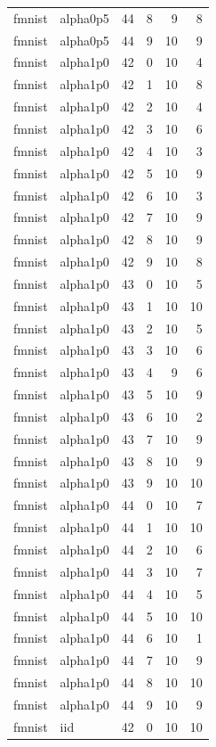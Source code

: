 \begin{tabular}{llrrrr}
fmnist & alpha0p5 & 44 & 8 & 9 & 8 \\
fmnist & alpha0p5 & 44 & 9 & 10 & 9 \\
fmnist & alpha1p0 & 42 & 0 & 10 & 4 \\
fmnist & alpha1p0 & 42 & 1 & 10 & 8 \\
fmnist & alpha1p0 & 42 & 2 & 10 & 4 \\
fmnist & alpha1p0 & 42 & 3 & 10 & 6 \\
fmnist & alpha1p0 & 42 & 4 & 10 & 3 \\
fmnist & alpha1p0 & 42 & 5 & 10 & 9 \\
fmnist & alpha1p0 & 42 & 6 & 10 & 3 \\
fmnist & alpha1p0 & 42 & 7 & 10 & 9 \\
fmnist & alpha1p0 & 42 & 8 & 10 & 9 \\
fmnist & alpha1p0 & 42 & 9 & 10 & 8 \\
fmnist & alpha1p0 & 43 & 0 & 10 & 5 \\
fmnist & alpha1p0 & 43 & 1 & 10 & 10 \\
fmnist & alpha1p0 & 43 & 2 & 10 & 5 \\
fmnist & alpha1p0 & 43 & 3 & 10 & 6 \\
fmnist & alpha1p0 & 43 & 4 & 9 & 6 \\
fmnist & alpha1p0 & 43 & 5 & 10 & 9 \\
fmnist & alpha1p0 & 43 & 6 & 10 & 2 \\
fmnist & alpha1p0 & 43 & 7 & 10 & 9 \\
fmnist & alpha1p0 & 43 & 8 & 10 & 9 \\
fmnist & alpha1p0 & 43 & 9 & 10 & 10 \\
fmnist & alpha1p0 & 44 & 0 & 10 & 7 \\
fmnist & alpha1p0 & 44 & 1 & 10 & 10 \\
fmnist & alpha1p0 & 44 & 2 & 10 & 6 \\
fmnist & alpha1p0 & 44 & 3 & 10 & 7 \\
fmnist & alpha1p0 & 44 & 4 & 10 & 5 \\
fmnist & alpha1p0 & 44 & 5 & 10 & 10 \\
fmnist & alpha1p0 & 44 & 6 & 10 & 1 \\
fmnist & alpha1p0 & 44 & 7 & 10 & 9 \\
fmnist & alpha1p0 & 44 & 8 & 10 & 10 \\
fmnist & alpha1p0 & 44 & 9 & 10 & 9 \\
fmnist & iid & 42 & 0 & 10 & 10 \\

\end{tabular}
